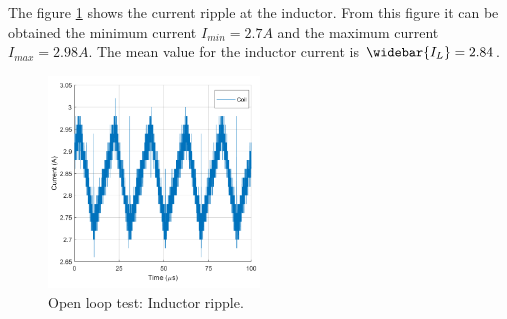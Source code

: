 The figure \ref{Openlooptestinductor} shows the current ripple at the inductor. From this figure it can be obtained  the minimum current $I_{min} = 2.7A$ and the maximum current $I_{max} = 2.98A$. The mean value for the inductor current is $\widebar{I_L}= 2.84$.

\begin{figure}[H]
	\begin{center}
		\includegraphics[width=0.5\textwidth]{../Pictures/P1/Test/Openloopinductor}
		\caption{Open loop test: Inductor ripple.}
		\label{Openlooptestinductor}
	\end{center}	
\end{figure}